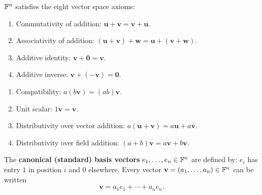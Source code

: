 \begin{propbox}
$\mathbb{F}^n$ satisfies the eight vector space axioms:
\begin{enumerate}[label=A\arabic*.]
    \item Commutativity of addition: $\mathbf{u}+\mathbf{v}=\mathbf{v}+\mathbf{u}$.
    \item Associativity of addition: $(\mathbf{u}+\mathbf{v})+\mathbf{w}=\mathbf{u}+(\mathbf{v}+\mathbf{w})$.
    \item Additive identity: $\mathbf{v}+\mathbf{0}=\mathbf{v}$.
    \item Additive inverse: $\mathbf{v}+(-\mathbf{v})=\mathbf{0}$.
\end{enumerate}
\begin{enumerate}[label=P\arabic*.]
    \item Compatibility: $a(b\mathbf{v})=(ab)\mathbf{v}$.
    \item Unit scalar: $1\mathbf{v}=\mathbf{v}$.
    \item Distributivity over vector addition: $a(\mathbf{u}+\mathbf{v})=a\mathbf{u}+a\mathbf{v}$.
    \item Distributivity over field addition: $(a+b)\mathbf{v}=a\mathbf{v}+b\mathbf{v}$.
\end{enumerate}
\end{propbox}

\begin{defbox}
The \textbf{canonical (standard) basis vectors} $e_1,\ldots,e_n\in\mathbb{F}^n$ are
defined by: $e_i$ has entry $1$ in position $i$ and $0$ elsewhere.
Every vector $\mathbf{v}=(a_1,\ldots,a_n)\in\mathbb{F}^n$ can be written
\[
    \mathbf{v} = a_1 e_1 + \cdots + a_n e_n.
\]
\end{defbox}

